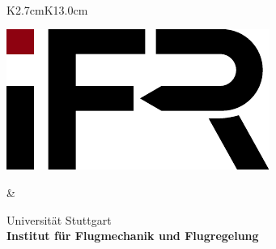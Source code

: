 \begin{titlepage}

\vspace*{2cm}
\begin{center}
\begin{ptm}
\fbox{
\begin{minipage}{\textwidth}
\begin{center}
\vspace{0.5cm}
 \textbf{\ifrtitle}
\vspace{0.5cm}
\end{center}
\end{minipage}
}

\vspace{4cm}
\textbf{\ifrauthor}\\
\vspace{1cm}
\textbf{\ifrtype}\\
\vspace{0.5cm}
\textbf{\the\year}
\\

\end{ptm}
\end{center}
\vfill
\begin{tabular}{K{2.7cm}K{13.0cm}}
	\begin{minipage}{\columnwidth}
	 \includegraphics[scale=0.4, trim= -0.0cm 0.05cm 0cm 0cm] {./src/pics/logo/ifrlogo.pdf}
	 \vspace{0.1cm}
	 \end{minipage}
	  & 
	\begin{minipage}{\columnwidth}
	\vfill
 \sffamily \large Universität Stuttgart \\ \textbf{Institut für Flugmechanik und Flugregelung}\vspace{0.1cm}
	 \end{minipage}\\
	 
	 \hline
 \end{tabular}

\end{titlepage}